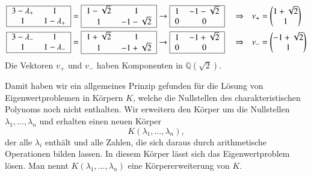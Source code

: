 \[
\begin{aligned}
\begin{tabular}{|>{$}c<{$}>{$}c<{$}|}
\hline
3-\lambda_+&1          \\
1          &1-\lambda_+\\
\hline
\end{tabular}
&=
\begin{tabular}{|>{$}c<{$}>{$}c<{$}|}
\hline
1-\sqrt{2}& 1         \\
1         &-1-\sqrt{2}\\
\hline
\end{tabular}
\rightarrow
\begin{tabular}{|>{$}c<{$}>{$}c<{$}|}
\hline
1&-1-\sqrt{2}\\
0&0          \\
\hline
\end{tabular}
&&\Rightarrow&v_+&=\begin{pmatrix}1+\sqrt{2}\\1\end{pmatrix}
\\
\begin{tabular}{|>{$}c<{$}>{$}c<{$}|}
\hline
3-\lambda_-&1          \\
1          &1-\lambda_-\\
\hline
\end{tabular}
&=
\begin{tabular}{|>{$}c<{$}>{$}c<{$}|}
\hline
1+\sqrt{2}& 1         \\
1         &-1+\sqrt{2}\\
\hline
\end{tabular}
\rightarrow
\begin{tabular}{|>{$}c<{$}>{$}c<{$}|}
\hline
1&-1+\sqrt{2}\\
0&0          \\
\hline
\end{tabular}
&&\Rightarrow&v_-&=\begin{pmatrix}-1+\sqrt{2}\\1\end{pmatrix}
\end{aligned}
\]
Die Vektoren $v_+$ und $v_-$ haben Komponenten in $\mathbb Q(\!\sqrt{2})$.

Damit haben wir ein allgemeines Prinzip gefunden
für die Lösung von Eigenwertproblemen in Körpern $K$,
welche die Nullstellen des charakteristischen Polynoms noch
nicht enthalten. 
Wir erweitern den Körper um die Nullstellen $\lambda_1,\dots,\lambda_n$
und erhalten einen neuen Körper
\[
K(\lambda_1,\dots,\lambda_n),
\]
der alle $\lambda_i$ enthält und alle Zahlen, die sich daraus durch
arithmetische Operationen bilden lassen.
In diesem Körper lässt sich das Eigenwertproblem lösen.
Man nennt $K(\lambda_1,\dots,\lambda_n)$ eine Körpererweiterung von $K$.
%

